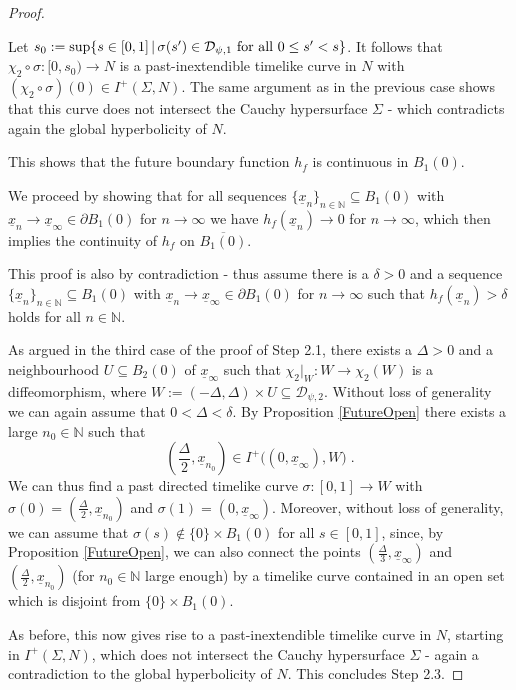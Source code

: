 \documentclass[reqno]{article}
\newcommand{\N}{\mathbb{N}}
\newcommand{\D}{\mathcal{D}}
\newcommand{\ux}{\underline{x}}
\begin{document}
\begin{proof}
\begin{enumerate}
Let $s_0 := \sup\{s \in [0,1] \, | \, \sigma(s') \in \D_{\psi,1} \textnormal{ for all } 0 \leq s' < s\}$. It follows that $\chi_2 \circ \sigma : [0,s_0) \to N$ is a past-inextendible timelike curve in $N$ with $(\chi_2 \circ \sigma)(0) \in I^+(\Sigma, N)$. The same argument as in the previous case shows that this curve does not intersect the Cauchy hypersurface $\Sigma$ - which contradicts again the global hyperbolicity of $N$.
\end{enumerate}
This shows that the future boundary function $h_f$ is continuous in $B_1(0)$.

We proceed by showing that for all sequences $\{\ux_n\}_{n \in \N} \subseteq B_1(0)$ with $\ux_n \to \ux_\infty \in \partial B_1(0)$ for $n \to \infty$ we have $h_f(\ux_n) \to 0$ for $n \to \infty$, which then implies the continuity of $h_f$ on $\overline{B_1(0)}$. 

This proof is also by contradiction - thus assume there is a $\delta >0$  and a sequence $\{\ux_n\}_{n \in \N} \subseteq B_1(0)$ with $\ux_n \to \ux_\infty \in \partial B_1(0)$ for $n \to \infty$ such that $h_f(\ux_n) > \delta$ holds for all $n \in \N$.

As argued in the third case of the proof of Step 2.1, there exists a $\Delta >0$ and a neighbourhood $U \subseteq B_2(0)$ of $\ux_\infty$ such that $\chi_2|_W : W \to \chi_2(W)$ is a diffeomorphism, where $W:= (-\Delta, \Delta) \times U \subseteq \D_{\psi,2}$. Without loss of generality we can again assume that $0 < \Delta < \delta$. By Proposition \ref{FutureOpen} there exists a large $n_0 \in \N$ such that
\begin{equation*}
(\frac{\Delta}{2} , \ux_{n_0}) \in  I^+\big((0,\ux_\infty), W\big) \;.
\end{equation*}
We can thus find a past directed timelike curve $\sigma : [0,1] \to W$ with $\sigma(0) =( \frac{\Delta}{2}, \ux_{n_0})$ and $\sigma(1) =(0, \ux_\infty)$. Moreover, without loss of generality, we can assume that $\sigma(s) \notin \{0\} \times B_1(0)$ for all $s \in [0,1]$, since, by Proposition \ref{FutureOpen}, we can also connect the points $(\frac{\Delta}{3}, \ux_\infty)$ and $(\frac{\Delta}{2}, \ux_{n_0})$ (for $n_0 \in \N$ large enough) by a timelike curve contained in an open set which is disjoint from $\{0\} \times B_1(0)$.

\begin{center}
\def\svgwidth{6cm}

\end{center}

As before, this now gives rise to a past-inextendible timelike curve in $N$, starting in $I^+(\Sigma, N)$, which does not intersect the Cauchy hypersurface $\Sigma$ - again a contradiction to the global hyperbolicity of $N$.
This concludes Step 2.3.
\vspace*{2mm}


\end{proof}
\end{document}
